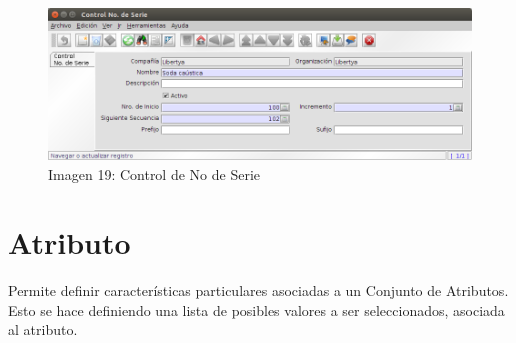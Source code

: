 \documentclass[letterpaper,10pt,spanish]{sphinxmanual}
\begin{document}
\begin{figure}[htbp]
\centering
\capstart

\includegraphics{ly_ctrserie.png}
\caption{Imagen 19: Control de No de Serie}\end{figure}


\section{Atributo}
\label{maestros:atributo}
Permite definir características particulares asociadas a un Conjunto de Atributos. Esto se hace definiendo una lista de posibles valores a ser seleccionados, asociada al atributo.
\end{document}
